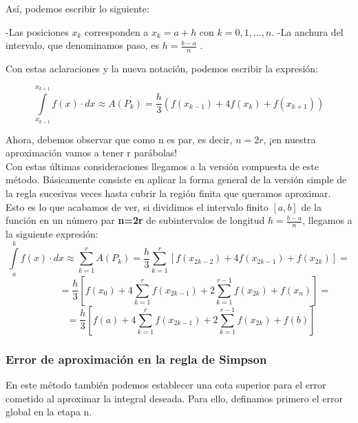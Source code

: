 \documentclass[12pt]{article}
\begin{document}
Así, podemos escribir lo siguiente:

\begin{flushleft}
-Las posiciones $x_k$ corresponden a $x_k=a+h$ con $k=0,1,...,n$.\newline
-La anchura del intervalo, que denominamos paso, es $h=\frac{b-a}{n}$ .
\end{flushleft}

Con estas aclaraciones y la nueva notación, podemos escribir la expresión:

\begin{equation}
\int \limits_{x_{k-1}}^{x_{k+1}} f(x) \cdot dx \approx 
A(P_k) =
\frac{h}{3}(f(x_{k-1})+4f(x_k)+f(x_{k+1}))
\end{equation}

Ahora, debemos observar que como n es par, es decir, $n=2r$, ¡en nuestra aproximación vamos a tener r parábolas!\\

Con estas últimas consideraciones llegamos a la versión compuesta de este método. Básicamente consiste en aplicar la forma general de la versión simple de la regla sucesivas veces hasta cubrir la región finita que queramos aproximar.\\

Esto es lo que acabamos de ver, si dividimos el intervalo finito $[a,b]$ de la función en un número par \textbf{n=2r} de subintervalos de longitud $h=\frac{b-a}{n}$, llegamos a la siguiente expresión:
\begin{equation*}
\int \limits_{a}^{b} f(x) \cdot dx \approx 
 \sum_{k=1}^{r}A(P_k) =
\frac{h}{3}\sum_{k=1}^{r}[f(x_{2k-2})+4f(x_{2k-1})+f(x_{2k})] =
\end{equation*}
\begin{equation*}
\;\;\;\;\;\;\;\;\;\;\;\;
=\frac{h}{3}[f(x_0)+4\sum_{k=1}^{r}f(x_{2k-1})+2\sum_{k=1}^{r-1}f(x_{2k})+f(x_n)] =
\end{equation*}
\begin{equation}
\;\;\;\;\;\;\;\;\;
=\frac{h}{3}[f(a)+4\sum_{k=1}^{r}f(x_{2k-1})+2\sum_{k=1}^{r-1}f(x_{2k})+f(b)]
\end{equation}

\subsubsection{Error de aproximación en la regla de Simpson}

En este método también podemos establecer una cota superior para el error cometido al aproximar la integral deseada. Para ello, definamos primero el error global en la etapa n.
\end{document}
